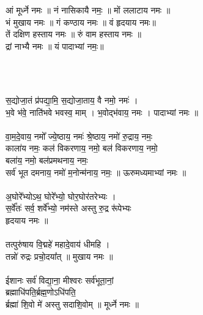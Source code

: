 \subsection{}
\\
आं मूर्ध्ने नमः ॥ नं नासिकायै नमः॒ ॥ मों ललाटाय नमः ॥\\
भं मुखाय नमः ॥ गं कण्ठाय नमः ॥  वं हृदयाय नमः॥\\
तें दक्षिण हस्ताय नमः ॥  रुं वाम हस्ताय नमः ॥\\
द्रां नाभ्यै नमः ॥ यं पादाभ्यां नमः॒॥\\
\\
\subsection{}
\\
स॒द्योजा॒तं प्र॑पद्या॒मि॒ स॒द्योजा॒ताय॒ वै नमो॒ नमः॑ ।\\
भ॒वे भ॑वे॒ नाति॑भवे भवस्व॒ माम् । भ॒वोद्भ॑वाय॒ नमः । पादाभ्यां नमः ॥\\
\\
वा॒म॒दे॒वाय॒ नमो᳚ ज्ये॒ष्ठाय॒ नमः॑  श्रे॒ष्ठाय॒ नमो॑ रु॒द्राय॒ नमः॒ \\
काला॑य नमः॒ कल॑ विकरणाय॒ नमो॒  बल॑ विकरणाय॒ नमो॒\\
बला॑य॒ नमो॒ बल॑प्रमथनाय॒ नमः॒ \\
सर्व॑ भूत दमनाय॒ नमो॑ म॒नोन्म॑नाय॒ नमः॒ ॥ ऊरुमध्यमाभ्यां नमः ॥\\
\\
अ॒घोरे᳚भ्योऽथ॒ घोरे᳚भ्यो॒ घोर॒घोर॑तरेभ्यः । \\
स॒र्वे᳚तः॑ सर्व॒ शर्वे᳚भ्यो॒ नम॑स्ते अस्तु रु॒द्र रू॑पेभ्यः\\
हृदयाय नमः ॥\\
\\
तत्पुरु॑षाय वि॒द्महे॑ महादे॒वाय॑ धीमहि । \\
तन्नो॑ रुद्रः प्रचो॒दया᳚त्  ॥ मुखाय नमः ॥\\
\\
ईशानः सर्व॑ विद्या॒ना॒ मीश्वरः सर्व॑भूता॒नां॒\\
ब्रह्माधि॑पति॒र्ब्रह्म॒णोऽधि॑पति॒ \\
र्ब्रह्मा॑ शि॒वो मे॑ अस्तु सदाशि॒वोम् ॥ मूर्ध्ने नमः ॥\\
\\
